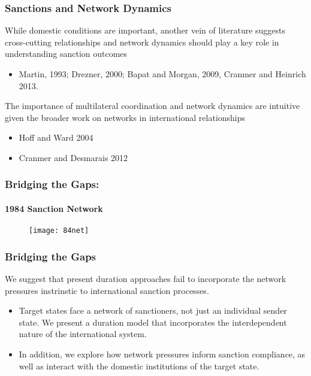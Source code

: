 \documentclass{beamer}
\begin{document}
\begin{frame}
\frametitle{Sanctions and Network Dynamics}
While domestic conditions are important, another vein of literature suggests cross-cutting relationships and network dynamics should play a key role in understanding sanction outcomes 
\begin{itemize}
\item Martin, 1993; Drezner, 2000; Bapat and Morgan, 2009, Cranmer and Heinrich 2013. 
\end{itemize}

The importance of multilateral coordination and network dynamics are intuitive given the broader work on networks in international relationships 
\begin{itemize}
\item Hoff and Ward 2004
\item Cranmer and Desmarais 2012
\end{itemize} 
\end{frame}

\begin{frame}
\frametitle{Bridging the Gaps:}
\framesubtitle{1984 Sanction Network}
\vspace{-0.25cm}
\begin{figure}[ht]
  \centering
  \texttt{[image: 84net]}
\end{figure}

\end{frame}

\begin{frame}
\frametitle{Bridging the Gaps}
We suggest that present duration approaches fail to incorporate the network pressures instrinstic to international sanction processes. 

\begin{itemize}
\item Target states face a network of sanctioners, not just an individual sender state. We present a duration model that incorporates the interdependent nature of the international system. 
\item In addition, we explore how network pressures inform sanction compliance, as well as interact with the domestic institutions of the target state. 
\end{itemize}
\end{frame}
\end{document}
